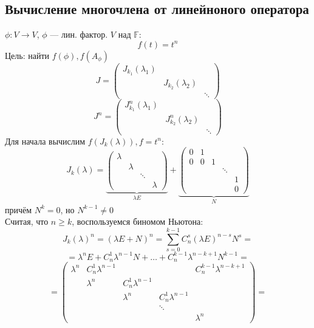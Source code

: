\subsection{Вычисление многочлена от линейноного оператора}
$\phi \colon V \rightarrow V$, $\phi$ --- лин. фактор. $V$ над $\mathbb{F}$:
\[
f(t) = t^{n}
\]
Цель: найти $f(\phi), f(A_\phi)$
\[
    J = \begin{pmatrix} J_{k_1}(\lambda_1) \\ & J_{k_2}(\lambda_2) \\ & & \ddots \end{pmatrix}
\]
\[
    J^{n} = \begin{pmatrix} J_{k_1}^{n}(\lambda_1) \\ & J_{k_2}^{n}(\lambda_2) \\ & & \ddots \end{pmatrix}
\]
Для начала вычислим $f(J_{k}(\lambda)), f = t^{n}$:
\[
    J_{k}(\lambda) = \underbrace{\begin{pmatrix} \lambda \\ & \lambda \\ & & \ddots \\ & & & \lambda\end{pmatrix}}_{\lambda E} + \underbrace{\begin{pmatrix}0 & 1 \\ 0 & 0 & 1 \\ & & & \ddots \\ & & & & 1 \\ & & & & 0\end{pmatrix}}_{N}
\]
причём $N^{k} = 0$, но $N^{k - 1} \neq 0$ \\
Считая, что $n \geq k$, воспользуемся биномом Ньютона:
\[
    J_k(\lambda)^{n} = (\lambda E + N)^{n} = \sum_{s = 0}^{k - 1} C_{n}^{s} (\lambda E)^{n - s} N^{s} = 
\]
\[
    = \lambda^{n} E + C_{n}^{1} \lambda^{n - 1} N + \ldots + C_{n}^{k - 1} \lambda^{n - k + 1} N^{k - 1} = 
\]
\begin{equation}
    \label{eq:07_jordan_power}
    = \begin{pmatrix}\lambda^{n} & C_{n}^{1} \lambda^{n - 1} & & & C_{n}^{k - 1} \lambda^{n - k + 1}\\ & \lambda^{n} & C_{n}^{1}\lambda^{n - 1} \\ & & \lambda^{n} & C_{n}^{1}\lambda^{n - 1} \\ & & & \ddots \\ & & & & \lambda^{n} \end{pmatrix} =
\end{equation}
